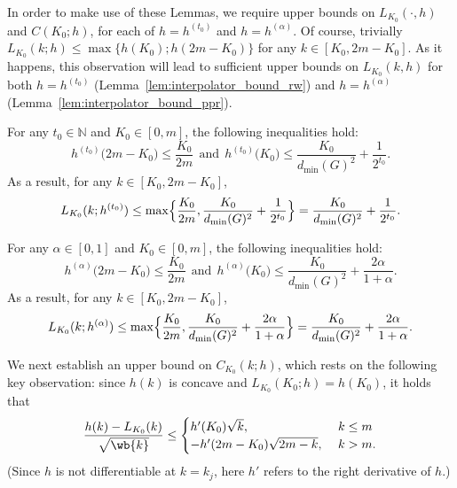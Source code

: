 In order to make use of these Lemmas, we require upper bounds on $L_{K_0}(\cdot,h)$ and $C(K_0;h)$, for each of $h = h^{(t_0)}$ and $h = h^{(\alpha)}$. Of course, trivially $L_{K_0}(k;h) \leq \max\{h(K_0); h(2m - K_0)\}$ for any $k \in [K_0, 2m - K_0]$. As it happens, this observation will lead to sufficient upper bounds on $L_{K_0}(k,h)$ for both $h = h^{(t_0)}$ (Lemma~\ref{lem:interpolator_bound_rw}) and $h = h^{(\alpha)}$ (Lemma~\ref{lem:interpolator_bound_ppr}).  
\begin{lemma}
	\label{lem:interpolator_bound_rw}
	For any $t_0 \in \mathbb{N}$ and $K_0 \in [0,m]$, the following inequalities hold:
	\begin{equation}
	\label{eqn:interpolator_bound_rw}
	h^{(t_0)}\bigl(2m - K_0\bigr) \leq \frac{K_0}{2m}~~\textrm{and}~~h^{(t_0)}\bigl(K_0\bigr) \leq \frac{K_0}{d_{\min}(G)^2} + \frac{1}{2^{t_0}}.
	\end{equation}
	As a result, for any $k \in [K_0, 2m - K_0]$,
	\begin{equation}
	\label{eqn:interpolator_bound_rw_2}
	L_{K_0}(k;h^{(t_0)}) \leq \max\Bigl\{\frac{K_0}{2m}, \frac{K_0}{d_{\min}(G)^2} + \frac{1}{2^{t_0}}\Bigr\} = \frac{K_0}{d_{\min}(G)^2} + \frac{1}{2^{t_0}}.
	\end{equation}
\end{lemma}

\begin{lemma}
	\label{lem:interpolator_bound_ppr}
	For any $\alpha \in [0,1]$ and $K_0 \in [0,m]$, the following inequalities hold:
	\begin{equation}
	\label{eqn:interpolator_bound_ppr}
	h^{(\alpha)}\bigl(2m - K_0\bigr) \leq \frac{K_0}{2m}~~\textrm{and}~~h^{(\alpha)}\bigl(K_0\bigr) \leq \frac{K_0}{d_{\min}(G)^2} + \frac{2\alpha}{1 + \alpha}.
	\end{equation}
	As a result, for any $k \in [K_0, 2m - K_0]$,
	\begin{equation}
	\label{eqn:interpolator_bound_ppr_2}
	L_{K_0}(k;h^{(\alpha)}) \leq \max\Bigl\{\frac{K_0}{2m}, \frac{K_0}{d_{\min}(G)^2} + \frac{2\alpha}{1 + \alpha}\Bigr\} = \frac{K_0}{d_{\min}(G)^2} + \frac{2\alpha}{1 + \alpha}.
	\end{equation}
\end{lemma}

We next establish an upper bound on $C_{K_0}(k;h)$, which rests on the following key observation: since $h(k)$ is concave and $L_{K_0}(K_0;h) = h(K_0)$, it holds that
\begin{equation}
\label{pf:linearization_bound_1}
\frac{h(k) - L_{K_0}(k)}{\sqrt{\wb{k}}} \leq
\begin{cases}
h'(K_0) \sqrt{k},~& k \leq m \\
-h'(2m - K_0) \sqrt{2m - k},~& k > m.
\end{cases}
\end{equation}
(Since $h$ is not differentiable at $k = k_j$, here $h'$ refers to the right derivative of $h$.)  

